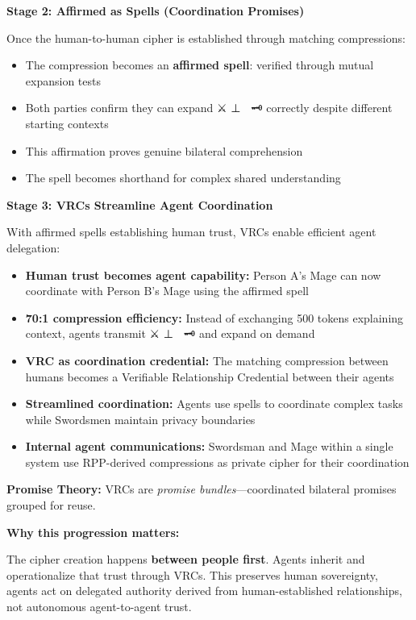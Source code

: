 \documentclass[
]{article}
\begin{document}
\textbf{Stage 2: Affirmed as Spells (Coordination Promises)}

Once the human-to-human cipher is established through matching
compressions:

\begin{itemize}
\item
  The compression becomes an \textbf{affirmed spell}: verified through
  mutual expansion tests
\item
  Both parties confirm they can expand ⚔️ ⊥ 🔮 \textbar{} 🗝️ correctly
  despite different starting contexts
\item
  This affirmation proves genuine bilateral comprehension
\item
  The spell becomes shorthand for complex shared understanding
\end{itemize}

\textbf{Stage 3: VRCs Streamline Agent Coordination}

With affirmed spells establishing human trust, VRCs enable efficient
agent delegation:

\begin{itemize}
\item
  \textbf{Human trust becomes agent capability:} Person A's Mage can now
  coordinate with Person B's Mage using the affirmed spell
\item
  \textbf{70:1 compression efficiency:} Instead of exchanging 500 tokens
  explaining context, agents transmit ⚔️ ⊥ 🔮 \textbar{} 🗝️ and expand
  on demand
\item
  \textbf{VRC as coordination credential:} The matching compression
  between humans becomes a Verifiable Relationship Credential between
  their agents
\item
  \textbf{Streamlined coordination:} Agents use spells to coordinate
  complex tasks while Swordsmen maintain privacy boundaries
\item
  \textbf{Internal agent communications:} Swordsman and Mage within a
  single system use RPP-derived compressions as private cipher for their
  coordination
\end{itemize}

\textbf{Promise Theory:} VRCs are \emph{promise bundles}---coordinated
bilateral promises grouped for reuse.

\textbf{Why this progression matters:}

The cipher creation happens \textbf{between people first}. Agents
inherit and operationalize that trust through VRCs. This preserves human
sovereignty, agents act on delegated authority derived from
human-established relationships, not autonomous agent-to-agent trust.
\end{document}
